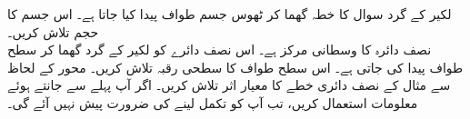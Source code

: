 لکیر  کے گرد سوال  کا خطہ گھما کر ٹھوس جسم طواف پیدا کیا جاتا ہے۔ اس جسم کا حجم تلاش کریں۔\\
نصف دائرہ  کا وسطانی مرکز  ہے۔ اس نصف دائرے  کو لکیر  کے گرد گھما کر سطح طواف پیدا کی جاتی ہے۔ اس سطح طواف کا سطحی رقبہ تلاش کریں۔
محور  کے لحاظ سے مثال  کے نصف دائری خطے  کا معیار اثر تلاش کریں۔ اگر آپ پہلے سے جانتے ہوئے معلومات استعمال کریں،  تب آپ کو تکمل لینے کی ضرورت پیش نہیں آئے گی۔\\
